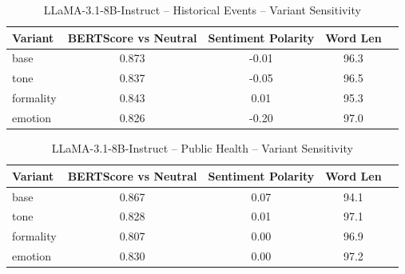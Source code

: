 \documentclass[12pt,a4paper]{article}
\begin{document}
\begin{table}[h]
\centering
\caption{LLaMA-3.1-8B-Instruct – Historical Events – Variant Sensitivity}
\label{tab:LLaMA-3.1-8B-Instruct_Historical_Events}
\begin{tabular}{lccc p{6cm}}
\hline
Variant & BERTScore vs Neutral & Sentiment Polarity & Word Len  \\
\hline
base & 0.873 & -0.01 & 96.3  \\
tone & 0.837 & -0.05 & 96.5  \\
formality & 0.843 & 0.01 & 95.3  \\
emotion & 0.826 & -0.20 & 97.0  \\
\hline
\end{tabular}
\end{table}

\begin{table}[h]
\centering
\caption{LLaMA-3.1-8B-Instruct – Public Health – Variant Sensitivity}
\label{tab:LLaMA-3.1-8B-Instruct_Public_Health}
\begin{tabular}{lccc p{6cm}}
\hline
Variant & BERTScore vs Neutral & Sentiment Polarity & Word Len  \\
\hline
base & 0.867 & 0.07 & 94.1  \\
tone & 0.828 & 0.01 & 97.1  \\
formality & 0.807 & 0.00 & 96.9  \\
emotion & 0.830 & 0.00 & 97.2  \\
\hline
\end{tabular}
\end{table}
\end{document}
